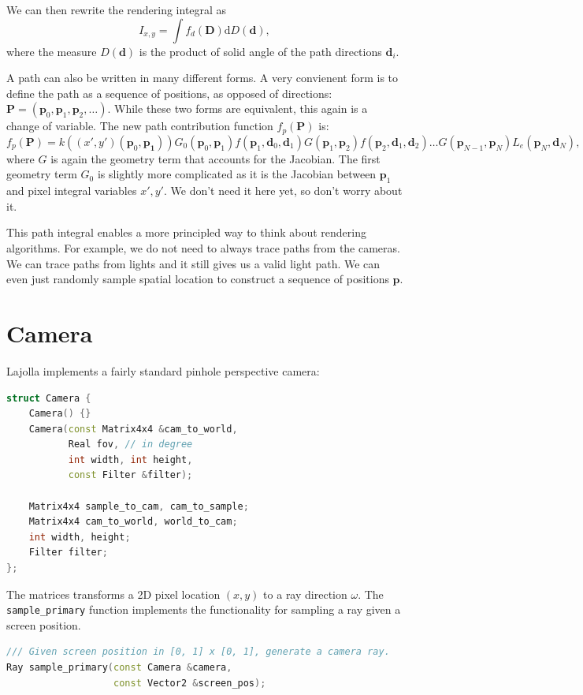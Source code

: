 \documentclass{article}
\begin{document}
We can then rewrite the rendering integral as
\begin{equation}
    I_{x, y} = \int f_d(\mathbf{D}) \mathrm{d} D(\mathbf{d}),
\end{equation}
where the measure $D(\mathbf{d})$ is the product of solid angle of the path directions $\mathbf{d}_i$.

A path can also be written in many different forms. A very convienent form is to define the path as a sequence of positions, as opposed of directions: $\mathbf{P} = (\mathbf{p}_0, \mathbf{p}_1, \mathbf{p}_2, \dots)$. While these two forms are equivalent, this again is a change of variable. The new path contribution function $f_p(\mathbf{P})$ is:
\begin{equation}
    f_p(\mathbf{P}) = k((x', y')(\mathbf{p}_0, \mathbf{p_1})) G_0(\mathbf{p}_0, \mathbf{p}_1) f(\mathbf{p}_1, \mathbf{d}_0, \mathbf{d}_1)G(\mathbf{p}_1, \mathbf{p}_2) f(\mathbf{p}_2, \mathbf{d}_1, \mathbf{d}_2) \dots G(\mathbf{p}_{N-1}, \mathbf{p}_{N}) L_e(\mathbf{p}_N, \mathbf{d}_N),
\end{equation}
where $G$ is again the geometry term that accounts for the Jacobian. The first geometry term $G_0$ is slightly more complicated as it is the Jacobian between $\mathbf{p}_1$ and pixel integral variables $x', y'$. We don't need it here yet, so don't worry about it.

This path integral enables a more principled way to think about rendering algorithms. For example, we do not need to always trace paths from the cameras. We can trace paths from lights and it still gives us a valid light path. We can even just randomly sample spatial location to construct a sequence of positions $\mathbf{p}$.

\section{Camera}

Lajolla implements a fairly standard pinhole perspective camera:
\begin{lstlisting}[language=c++]
struct Camera {
    Camera() {}
    Camera(const Matrix4x4 &cam_to_world,
           Real fov, // in degree
           int width, int height,
           const Filter &filter);

    Matrix4x4 sample_to_cam, cam_to_sample;
    Matrix4x4 cam_to_world, world_to_cam;
    int width, height;
    Filter filter;
};
\end{lstlisting}
The matrices transforms a 2D pixel location $(x, y)$ to a ray direction $\omega$. The \lstinline{sample_primary} function implements the functionality for sampling a ray given a screen position.
\begin{lstlisting}[language=c++]
/// Given screen position in [0, 1] x [0, 1], generate a camera ray.
Ray sample_primary(const Camera &camera,
                   const Vector2 &screen_pos);
\end{lstlisting}
\end{document}
